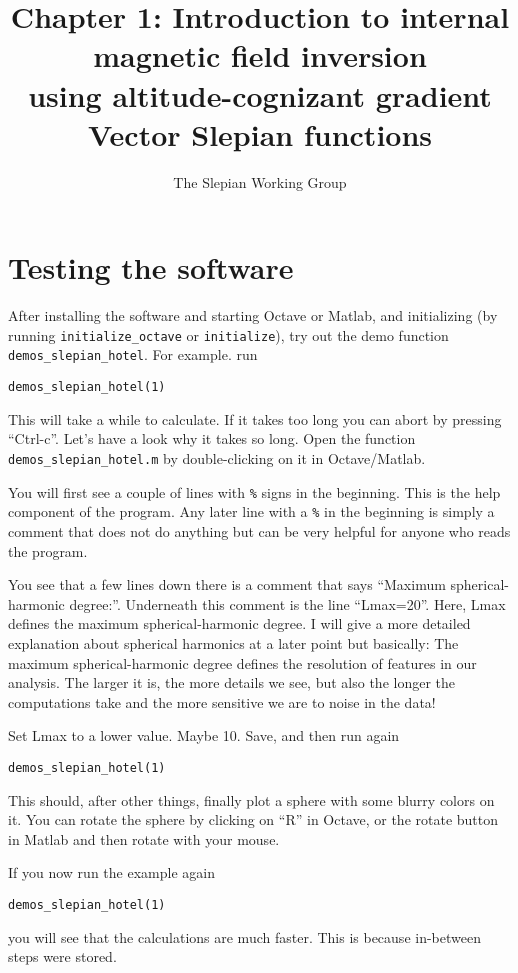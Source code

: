 \documentclass[11pt]{article}
\title{Chapter 1: Introduction to internal magnetic field inversion\\
  using altitude-cognizant gradient Vector Slepian functions}
\author{The Slepian Working Group}
\begin{document}
\maketitle


\section{Testing the software}

After installing the software and starting Octave or Matlab, and
initializing (by running \verb+initialize_octave+ or
\verb+initialize+), try out the demo function
\verb+demos_slepian_hotel+. For example. run

\verb+demos_slepian_hotel(1)+

This will take a while to calculate. If it takes too long you can
abort by pressing ``Ctrl-c''. Let's have a look why it takes so
long. Open the function \verb+demos_slepian_hotel.m+ by double-clicking
on it in Octave/Matlab.

You will first see a couple of lines with \verb+%+ signs in the
beginning. This is the help component of the program. Any later line
with a \verb+%+ in the beginning is simply a comment that does not do
anything but can be very helpful for anyone who reads the program.

You see that a few lines down there is a comment that says ``Maximum
spherical-harmonic degree:''. Underneath this comment is the line
``Lmax=20''. Here, Lmax defines the maximum spherical-harmonic
degree. I will give a more detailed explanation about spherical
harmonics at a later point but basically: The maximum
spherical-harmonic degree defines the resolution of features in our
analysis. The larger it is, the more details we see, but also the
longer the computations take and the more sensitive we are to noise in
the data!

Set Lmax to a lower value. Maybe 10. Save, and then run again

\qquad \verb+demos_slepian_hotel(1)+

This should, after other things, finally plot a sphere with some
blurry colors on it. You can rotate the sphere by clicking on ``R'' in
Octave, or the rotate button in Matlab and then rotate with your mouse.

If you now run the example again

\qquad \verb+demos_slepian_hotel(1)+

you will see that the calculations are much faster. This is because
in-between steps were stored.
\end{document}
